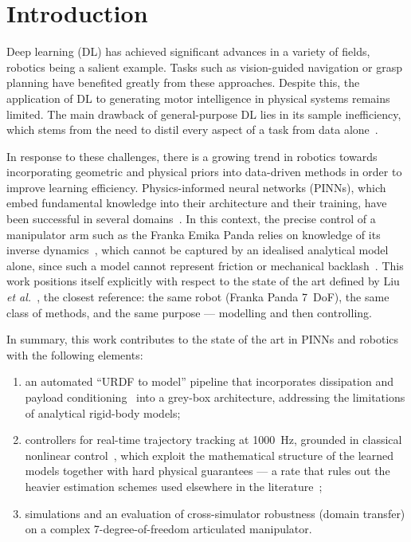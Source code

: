 \documentclass[a4paper, oneside]{article}
\begin{document}
\setcounter{tocdepth}{2}
\tableofcontents
\newpage

\section{Introduction}
\label{sec-intro}

Deep learning (DL) has achieved significant advances in a variety of fields, robotics being a salient example. Tasks such as vision-guided navigation or grasp planning have benefited greatly from these approaches. Despite this, the application of DL to generating motor intelligence in physical systems remains limited. The main drawback of general-purpose DL lies in its sample inefficiency, which stems from the need to distil every aspect of a task from data alone~\cite{ibarz2021}.

In response to these challenges, there is a growing trend in robotics towards incorporating geometric and physical priors into data-driven methods in order to improve learning efficiency. Physics-informed neural networks (PINNs), which embed fundamental knowledge into their architecture and their training, have been successful in several domains~\cite{toscano2025, ma2025}. In this context, the precise control of a manipulator arm such as the Franka Emika Panda relies on knowledge of its inverse dynamics~\cite{deng2024}, which cannot be captured by an idealised analytical model alone, since such a model cannot represent friction or mechanical backlash~\cite{hu2026}. This work positions itself explicitly with respect to the state of the art defined by Liu \emph{et al.}~\cite{liu2024}, the closest reference: the same robot (Franka Panda 7~DoF), the same class of methods, and the same purpose --- modelling and then controlling.

In summary, this work contributes to the state of the art in PINNs and robotics with the following elements:
%
\begin{enumerate}
    \item an automated ``URDF to model'' pipeline that incorporates dissipation and payload conditioning~\cite{li2025ral} into a grey-box architecture, addressing the limitations of analytical rigid-body models;
    \item controllers for real-time trajectory tracking at \SI{1000}{\hertz}, grounded in classical nonlinear control~\cite{liu2024}, which exploit the mathematical structure of the learned models together with hard physical guarantees --- a rate that rules out the heavier estimation schemes used elsewhere in the literature~\cite{wang2024cac};
    \item simulations and an evaluation of cross-simulator robustness (domain transfer) on a complex 7-degree-of-freedom articulated manipulator.
\end{enumerate}
\end{document}
